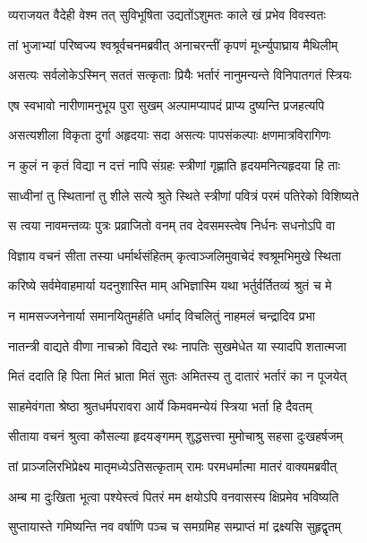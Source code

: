 \twolineshloka
{व्यराजयत वैदेही वेश्म तत् सुविभूषिता}
{उद्यतोंऽशुमतः काले खं प्रभेव विवस्वतः} %

\twolineshloka
{तां भुजाभ्यां परिष्वज्य श्वश्रूर्वचनमब्रवीत्}
{अनाचरन्तीं कृपणं मूर्ध्न्युपाघ्राय मैथिलीम्} %

\twolineshloka
{असत्यः सर्वलोकेऽस्मिन् सततं सत्कृताः प्रियैः}
{भर्तारं नानुमन्यन्ते विनिपातगतं स्त्रियः} %

\twolineshloka
{एष स्वभावो नारीणामनुभूय पुरा सुखम्}
{अल्पामप्यापदं प्राप्य दुष्यन्ति प्रजहत्यपि} %

\twolineshloka
{असत्यशीला विकृता दुर्गा अहृदयाः सदा}
{असत्यः पापसंकल्पाः क्षणमात्रविरागिणः} %

\twolineshloka
{न कुलं न कृतं विद्या न दत्तं नापि संग्रहः}
{स्त्रीणां गृह्णाति हृदयमनित्यहृदया हि ताः} %

\twolineshloka
{साध्वीनां तु स्थितानां तु शीले सत्ये श्रुते स्थिते}
{स्त्रीणां पवित्रं परमं पतिरेको विशिष्यते} %

\twolineshloka
{स त्वया नावमन्तव्यः पुत्रः प्रव्राजितो वनम्}
{तव देवसमस्त्वेष निर्धनः सधनोऽपि वा} %

\twolineshloka
{विज्ञाय वचनं सीता तस्या धर्मार्थसंहितम्}
{कृत्वाञ्जलिमुवाचेदं श्वश्रूमभिमुखे स्थिता} %

\twolineshloka
{करिष्ये सर्वमेवाहमार्या यदनुशास्ति माम्}
{अभिज्ञास्मि यथा भर्तुर्वर्तितव्यं श्रुतं च मे} %

\twolineshloka
{न मामसज्जनेनार्या समानयितुमर्हति}
{धर्माद् विचलितुं नाहमलं चन्द्रादिव प्रभा} %

\twolineshloka
{नातन्त्री वाद्यते वीणा नाचक्रो विद्यते रथः}
{नापतिः सुखमेधेत या स्यादपि शतात्मजा} %

\twolineshloka
{मितं ददाति हि पिता मितं भ्राता मितं सुतः}
{अमितस्य तु दातारं भर्तारं का न पूजयेत्} %

\twolineshloka
{साहमेवंगता श्रेष्ठा श्रुतधर्मपरावरा}
{आर्ये किमवमन्येयं स्त्रिया भर्ता हि दैवतम्} %

\twolineshloka
{सीताया वचनं श्रुत्वा कौसल्या हृदयङ्गमम्}
{शुद्धसत्त्वा मुमोचाश्रु सहसा दुःखहर्षजम्} %

\twolineshloka
{तां प्राञ्जलिरभिप्रेक्ष्य मातृमध्येऽतिसत्कृताम्}
{रामः परमधर्मात्मा मातरं वाक्यमब्रवीत्} %

\twolineshloka
{अम्ब मा दुःखिता भूत्वा पश्येस्त्वं पितरं मम}
{क्षयोऽपि वनवासस्य क्षिप्रमेव भविष्यति} %

\twolineshloka
{सुप्तायास्ते गमिष्यन्ति नव वर्षाणि पञ्च च}
{समग्रमिह सम्प्राप्तं मां द्रक्ष्यसि सुहृद्वृतम्} %

